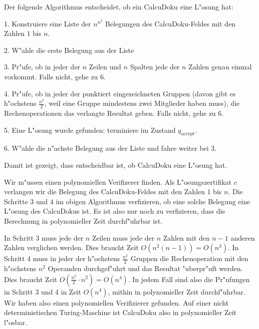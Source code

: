 \begin{loesung}
\begin{teilaufgaben}
\item
Der folgende Algorithmus entscheidet, ob ein CalcuDoku eine L"osung
hat:
\begin{compactenum}
\item[1.] Konstruiere eine Liste der $n^{n^2}$ Belegungen des CalcuDoku-Feldes
mit den Zahlen $1$ bis $n$.
\item[2.] W"ahle die erste Belegung aus der Liste
\item[3.] Pr"ufe, ob in jeder der $n$ Zeilen und $n$ Spalten jede der
$n$ Zahlen genau einmal vorkommt. Falls nicht, gehe zu 6.
\item[4.] Pr"ufe, ob in jeder der punktiert eingezeichneten Gruppen
(davon gibt es h"ochstens $\frac{n^2}2$, weil eine Gruppe mindestens
zwei Mitglieder haben muss), die Rechenoperationen das verlangte Resultat
geben. Falls nicht, gehe zu 6.
\item[5.]
Eine L"osung wurde gefunden: terminiere im Zustand $q_{\text{accept}}$.
\item[6.]
W"ahle die n"achste Belegung aus der Liste und fahre weiter bei 3.
\end{compactenum}
Damit ist gezeigt, dass entscheidbar ist, ob CalcuDoku eine L"osung
hat.
\item
Wir m"ussen einen polynomiellen Verifizerer finden. Als L"osungszertifikat
$c$ verlangen wir die Belegung des CalcuDoku-Feldes mit den Zahlen
$1$ bis $n$.
Die Schritte 3 und 4 im obigen Algorithmus verfizieren, ob eine solche
Belegung eine L"osung des CalcuDokus ist. Es ist also nur noch zu verfizieren,
dass die Berechnung in polynomieller Zeit durchf"uhrbar ist.

In Schritt 3 muss jede der $n$ Zeilen muss jede der $n$ Zahlen mit den
$n-1$ anderen Zahlen verglichen werden. Dies braucht Zeit $O(n^2(n-1))=O(n^3)$.
In Schritt 4 muss in jeder der h"ochstens $\frac{n^2}2$ Gruppen die 
Rechenoperation mit den h"ochstens $n^2$ Operanden durchgef"uhrt und das
Resultat "uberpr"uft werden. Dies braucht Zeit $O(\frac{n^2}2\cdot n^2)=O(n^4)$.
In jedem Fall sind also die Pr"ufungen in Schritt 3 und 4 in Zeit $O(n^4)$,
mithin in polynomieller Zeit durchf"uhrbar. Wir haben also einen polynomiellen
Verifizierer gefunden.
Auf einer nicht deterministischen Turing-Maschine ist CalcuDoku also
in polynomieller Zeit l"osbar.
\qedhere
\end{teilaufgaben}
\end{loesung}
